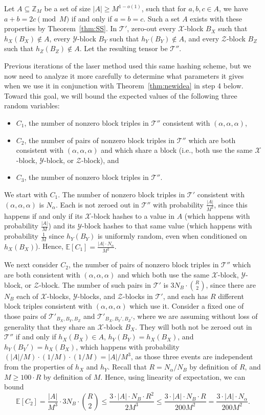 \PassOptionsToPackage{shortlabels}{enumitem}\documentclass[10pt,a4paper]{article}
\newcommand{\E}{\mathbb{E}}
\newcommand{\T}{\mathcal{T}}
\newcommand{\X}{\mathcal{X}}
\newcommand{\Y}{\mathcal{Y}}
\newcommand{\Z}{\mathcal{Z}}
\begin{document}
Let $A \subseteq \mathbb{Z}_M$ be a set of size $|A| \geq M^{1-o(1)}$, such that for $a,b,c \in A$, we have $a+b=2c \pmod{M}$ if and only if $a=b=c$. Such a set $A$ exists with these properties by Theorem~\ref{thm:SS}. In $\T'$, zero-out every $\X$-block $B_X$ such that $h_X(B_X) \notin A$, every $\Y$-block $B_Y$ such that $h_Y(B_Y) \notin A$, and every $\Z$-block $B_Z$ such that $h_Z(B_Z) \notin A$. Let the resulting tensor be $\T''$. 

Previous iterations of the laser method used this same hashing scheme, but we now need to analyze it more carefully to determine what parameters it gives when we use it in conjunction with Theorem~\ref{thm:newidea} in step 4 below. Toward this goal, we will bound the expected values of the following three random variables:
\begin{itemize}
    \item $C_1$, the number of nonzero block triples in $\T''$ consistent with $(\alpha,\alpha,\alpha)$,
    \item $C_2$, the number of pairs of nonzero block triples in $\T''$ which are both consistent with $(\alpha,\alpha,\alpha)$ and which share a block (i.e., both use the same $\X$-block, $\Y$-block, or $\Z$-block), and
    \item $C_3$, the number of nonzero block triples in $\T''$.
\end{itemize}

We start with $C_1$. The number of nonzero block triples in $\T'$ consistent with $(\alpha,\alpha,\alpha)$ is $N_\alpha$. Each is not zeroed out in $\T''$ with probability $\frac{|A|}{M^2}$, since this happens if and only if its $\X$-block hashes to a value in $A$ (which happens with probability $\frac{|A|}{M}$) and its $\Y$-block hashes to that same value (which happens with probability $\frac{1}{M}$ since $h_Y(B_Y)$ is uniformly random, even when conditioned on $h_X(B_X)$). Hence, $\E[C_1] = \frac{|A| \cdot N_\alpha}{M^2}$.

We next consider $C_2$, the number of pairs of nonzero block triples in $\T''$ which are both consistent with $(\alpha,\alpha,\alpha)$ and which both use the same $\X$-block, $\Y$-block, or $\Z$-block. The number of such pairs in $\T'$ is $3N_B \cdot \binom{R}{2}$, since there are $N_B$ each of $\X$-blocks, $\Y$-blocks, and $\Z$-blocks in $\T'$, and each has $R$ different block triples consistent with $(\alpha,\alpha,\alpha)$ which use it. Consider a fixed one of those pairs of $\T'_{B_X, B_Y, B_Z}$ and $\T'_{B_X, B_Y', B_Z'}$, where we are assuming without loss of generality that they share an $\X$-block $B_X$. They will both not be zeroed out in $\T''$ if and only if $h_X(B_X) \in A$, $h_Y(B_Y) = h_X(B_X)$, and $h_Y(B_Y') = h_X(B_X)$, which happens with probability $(|A|/M) \cdot (1/M) \cdot (1/M) = |A|/M^{3}$, as those three events are independent from the properties of $h_X$ and $h_Y$. Recall that $R = N_\alpha / N_B$ by definition of $R$, and $M \geq 100\cdot R$ by definition of $M$. Hence, using linearity of expectation, we can bound $$\E[C_2] = \frac{|A|}{M^3} \cdot 3 N_B \cdot \binom{R}{2} \leq \frac{3 \cdot |A| \cdot N_B \cdot R^2}{2 M^3} \leq \frac{3 \cdot |A| \cdot N_B \cdot R}{200 M^2} = \frac{3 \cdot |A| \cdot N_\alpha}{200 M^2}.$$
\end{document}
